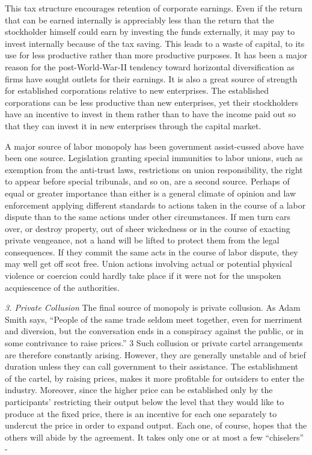 \documentclass[11pt,openany]{book}
\begin{document}
This tax structure encourages retention of corporate earnings. Even if the return that can be earned internally is appreciably less than the return that the stockholder himself could earn by investing the funds externally, it may pay to invest internally because of the tax saving. This leads to a waste of capital, to its use for less productive rather than more productive purposes. It has been a major reason for the post-World-War-II tendency toward horizontal diversification as firms have sought outlets for their earnings. It is also a great source of strength for established corporations relative to new enterprises. The established corporations can be less productive than new enterprises, yet their stockholders have an incentive to invest in them rather than to have the income paid out so that they can invest it in new enterprises through the capital market.

A major source of labor monopoly has been government assist-cussed above have been one source. Legislation granting special immunities to labor unions, such as exemption from the anti-trust laws, restrictions on union responsibility, the right to appear before special tribunals, and so on, are a second source. Perhaps of equal or greater importance than either is a general climate of opinion and law enforcement applying different standards to actions taken in the course of a labor dispute than to the same actions under other circumstances. If men turn cars over, or destroy property, out of sheer wickedness or in the course of exacting private vengeance, not a hand will be lifted to protect them from the legal consequences. If they commit the same acts in the course of labor dispute, they may well get off scot free. Union actions involving actual or potential physical violence or coercion could hardly take place if it were not for the unspoken acquiescence of the authorities.

\emph{3. Private Collusion} The final source of monopoly is private collusion. As Adam Smith says, ``People of the same trade seldom meet together, even for merriment and diversion, but the conversation ends in a conspiracy against the public, or in some contrivance to raise prices.'' 3 Such collusion or private cartel arrangements are therefore constantly arising. However, they are generally unstable and of brief duration unless they can call government to their assistance. The establishment of the cartel, by raising prices, makes it more profitable for outsiders to enter the industry. Moreover, since the higher price can be established only by the participants' restricting their output below the level that they would like to produce at the fixed price, there is an incentive for each one separately to undercut the price in order to expand output. Each one, of course, hopes that the others will abide by the agreement. It takes only one or at most a few ``chiselers'' -
\end{document}
